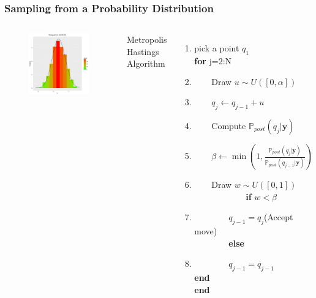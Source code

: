 \documentclass[11pt]{beamer}
\theoremstyle{plain}
\theoremstyle{definition}
\newcommand\ChangeFont{\fontsize{9}{7.2}\selectfont}
\newcommand{\p}{\mathbb{P}}
\newcommand{\post}{\p_{post}}
\begin{document}
\begin{frame}
\frametitle{Sampling from a Probability Distribution}

\begin{columns}[c]
\column{1.1in}
\begin{figure}
\includegraphics[scale=0.25]{histogram_mcmc}
\end{figure}

\column{2.0in}
\ChangeFont
Metropolis Hastings Algorithm
\begin{enumerate}
\item pick a point $q_{1}$\\
\textbf{for} j=2:N
\item $\qquad$Draw $u\sim U([0,\alpha])$
\item $\qquad q_{j}\leftarrow q_{j-1}+u$
\item $\qquad$Compute $\post(q_{j}|\textbf{y})$
\item $\qquad\beta\leftarrow\min(1,\frac{\post(q_{j}|\textbf{y})}{\post(q_{j-1}|\textbf{y})})$
\item $\qquad$Draw $w\sim U([0,1])$\\
$\qquad\qquad\qquad$\textbf{if} $w<\beta$
\item $\qquad\qquad q_{j-1}=q_{j}$\qquad(Accept move)\\
$\qquad\qquad$\textbf{else}
\item
        $\qquad\qquad q_{j-1}=q_{j-1}$\\
\textbf{end}\\
\textbf{end}
\end{enumerate}
\end{columns}
\end{frame}
\end{document}
